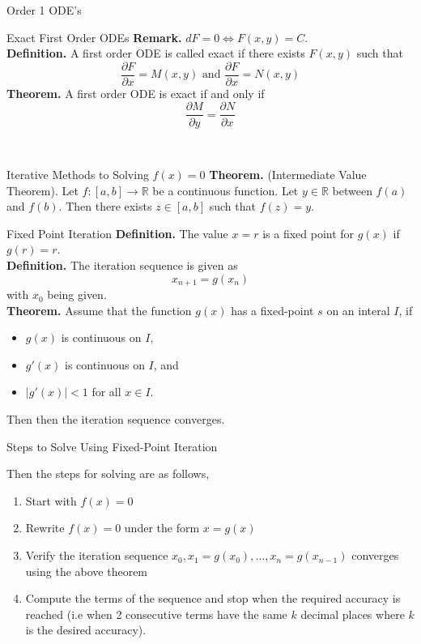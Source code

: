 \documentclass{article}
\begin{document}
\begin{multicols*}{3}
\begin{blackbox}{Order 1 ODE's}
\begin{bluebox}{Exact First Order ODEs}
        \textbf{Remark.} $dF = 0 \iff F(x,y) = C$.\\[1ex]
        \textbf{Definition.} A first order ODE is called exact if there exists $F(x,y)$ such that 
        \[\frac{\partial F}{\partial x} = M(x,y) \text{ and } \frac{\partial F}{\partial x} = N(x,y)\]
        \textbf{Theorem.} A first order ODE is exact if and only if
        \[\frac{\partial M}{\partial y} = \frac{\partial N}{\partial x}\]
    \end{bluebox}\\[-2ex]
\end{blackbox}
\begin{blackbox}{Iterative Methods to Solving $f(x) = 0$}
    \textbf{Theorem.} (Intermediate Value Theorem). Let $f: [a,b] \rightarrow \mathbb{R}$ be a continuous function. Let $y \in \mathbb{R}$ between $f(a)$ and $f(b)$. Then there exists $z \in [a,b]$ such that $f(z) = y$.
    \begin{bluebox}{Fixed Point Iteration}
        \textbf{Definition.} The value $x = r$ is a fixed point for $g(x)$ if $g(r) = r$.\\[1ex]
        \textbf{Definition.} The iteration sequence is given as 
        \[x_{n+1} = g(x_n)\]
        with $x_0$ being given. \\[1ex]
        \textbf{Theorem.} Assume that the function $g(x)$ has a fixed-point $s$ on an interal $I$, if 
        \begin{itemize}
            \item $g(x)$ is continuous on $I$,
            \item $g'(x)$ is continuous on $I$, and
            \item $|g'(x)| < 1$ for all $x \in I$.
        \end{itemize}
        Then then the iteration sequence converges.
        \begin{redbox}{Steps to Solve Using Fixed-Point Iteration}
           
            Then the steps for solving are as follows,
            \begin{enumerate}
                \item Start with $f(x) = 0$
                \item Rewrite $f(x) = 0$ under the form $x = g(x)$
                \item Verify the iteration sequence $x_0, x_1 = g(x_0), \ldots, x_n = g(x_{n-1})$ converges using the above theorem 
                \item Compute the terms of the sequence and stop when the required accuracy is reached (i.e when 2 consecutive terms have the same $k$ decimal places where $k$ is the desired accuracy).
            \end{enumerate}
        \end{redbox}
    \end{bluebox} 
\end{blackbox}


\end{multicols*}
\end{document}
